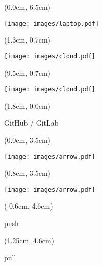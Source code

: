 \documentclass[aspectratio=169]{beamer}
\begin{document}
\begin{frame}{}

  \begin{textblock*}{5cm}(0.0cm, 6.5cm)
    \begin{center}
      \texttt{[image: images/laptop.pdf]}
    \end{center}
  \end{textblock*}

  \begin{textblock*}{5cm}(1.3cm, 0.7cm)
    \begin{center}
      \texttt{[image: images/cloud.pdf]}
    \end{center}
  \end{textblock*}
  
  \begin{textblock*}{5cm}(9.5cm, 0.7cm)
    \begin{center}
      \texttt{[image: images/cloud.pdf]}
    \end{center}
  \end{textblock*}
  
  \begin{textblock*}{5cm}(1.8cm, 0.0cm)
    \begin{center}
      {\small GitHub / GitLab}
    \end{center}
  \end{textblock*}  

  \begin{textblock*}{5cm}(0.0cm, 3.5cm)
    \begin{center}
      \texttt{[image: images/arrow.pdf]}
    \end{center}
  \end{textblock*}

  \begin{textblock*}{5cm}(0.8cm, 3.5cm)
    \begin{center}
      \texttt{[image: images/arrow.pdf]}
    \end{center}
  \end{textblock*}
  
  \begin{textblock*}{5cm}(-0.6cm, 4.6cm)
    \begin{center}
      {\small push}
    \end{center}
  \end{textblock*}

  \begin{textblock*}{5cm}(1.25cm, 4.6cm)
    \begin{center}
      {\small pull}
    \end{center}
  \end{textblock*}    
  

\end{frame}
\end{document}
